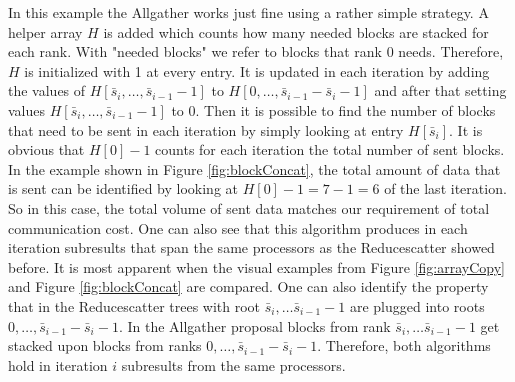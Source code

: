In this example the Allgather works just fine using a rather simple strategy. A helper array $H$ is added which counts how many needed blocks are stacked for each rank. With "needed blocks" we refer to blocks that rank $0$ needs. Therefore, $H$ is initialized with 1 at every entry. It is updated in each iteration by adding the values of $H[\bar{s}_i, \dots, \bar{s}_{i-1}-1]$ to $H[0,\dots, \bar{s}_{i-1}-\bar{s}_i-1]$ and after that setting values $H[\bar{s}_i, \dots, \bar{s}_{i-1}-1]$ to 0. Then it is possible to find the number of blocks that need to be sent in each iteration by simply looking at entry $H[\bar{s}_i]$. It is obvious that $H[0]-1$ counts for each iteration the total number of sent blocks. In the example shown in Figure \ref{fig:blockConcat}, the total amount of data that is sent can be identified by looking at $H[0]-1=7-1=6$ of the last iteration. So in this case, the total volume of sent data matches our requirement of total communication cost. One can also see that this algorithm produces in each iteration subresults that span the same processors as the Reducescatter showed before. It is most apparent when the visual examples from Figure \ref{fig:arrayCopy} and Figure \ref{fig:blockConcat} are compared. One can also identify the property that in the Reducescatter trees with root $\bar{s}_i, \dots \bar{s}_{i-1}-1$ are plugged into roots $0, \dots, \bar{s}_{i-1} - \bar{s}_i-1$. In the Allgather proposal blocks from rank $\bar{s}_i, \dots \bar{s}_{i-1}-1$ get stacked upon blocks from ranks $0, \dots, \bar{s}_{i-1} - \bar{s}_i-1$. Therefore, both algorithms hold in iteration $i$ subresults from the same processors.

